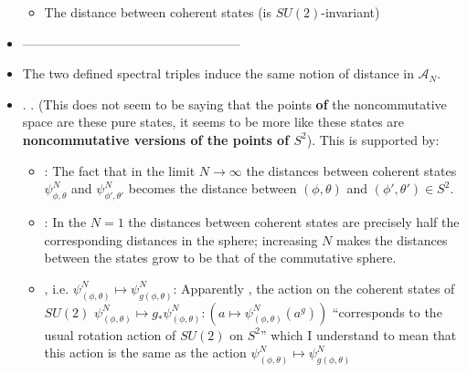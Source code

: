\documentclass{article}
\begin{document}
\begin{itemize}
\begin{itemize}
\begin{itemize}
            \end{itemize}
        
        \item The distance between coherent states (is $SU(2)$-invariant)
            
        \end{itemize}
    
    \item ---------------------------------------------------
    
    \item The two defined spectral triples induce the same notion of distance in $\mathcal A_N$.
    
    \item {}. . (This does not seem to be saying that the points \textbf{of} the noncommutative space are these pure states, it seems to be more like these states are \textbf{noncommutative versions of the points of $S^2$}). This is supported by: 
    
        \begin{itemize}
        
        \item {}: The fact that in the limit $N \to \infty$ the distances between coherent states $\psi^N_{\phi, \theta}$ and $\psi^N_{\phi', \theta'}$ becomes the distance between $(\phi, \theta)$ and $(\phi', \theta') \in S^2$.
        
        \item {}: In the $N = 1$ the distances between coherent states are precisely half the corresponding distances in the sphere; increasing $N$ makes the distances between the states grow to be that of the commutative sphere.
        
        \item {}, i.e. $\psi^N_{(\phi, \theta)} \mapsto \psi^N_{g(\phi, \theta)}$: Apparently , the action on the coherent states of $SU(2)$ $\psi^N_{(\phi, \theta)} \mapsto g_*\psi^N_{(\phi, \theta)}:(a \mapsto \psi^N_{(\phi, \theta)}(a^g))$ ``corresponds to the usual rotation action of $SU(2)$ on $S^2$'' which I understand to mean that this action is the same as the action $\psi^N_{(\phi, \theta)} \mapsto \psi^N_{g(\phi, \theta)}$
        

\end{itemize}
\end{itemize}
\end{document}

